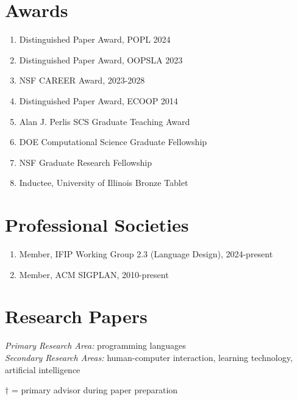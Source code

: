 \documentclass[10pt,letterpaper]{article}
\begin{document}
\section*{Awards}
\begin{enumerate}
  \item Distinguished Paper Award, POPL 2024
  \item Distinguished Paper Award, OOPSLA 2023
  \item NSF CAREER Award, 2023-2028
  \item Distinguished Paper Award, ECOOP 2014
  \item {Alan J. Perlis SCS Graduate Teaching Award}
  \item DOE Computational Science Graduate Fellowship
  \item NSF Graduate Research Fellowship
  \item Inductee, University of Illinois Bronze Tablet
\end{enumerate}

\section*{Professional Societies}
\begin{enumerate}
  \item Member, IFIP Working Group 2.3 (Language Design), 2024-present
  \item Member, ACM SIGPLAN, 2010-present
\end{enumerate}

\section*{Research Papers}

\textit{Primary Research Area:} programming languages \\
\textit{Secondary Research Areas:} human-computer interaction, learning technology, artificial intelligence

\newcommand{\advisee}[1]{#1$^\dagger$}
$\dagger$ = primary advisor during paper preparation
\end{document}
